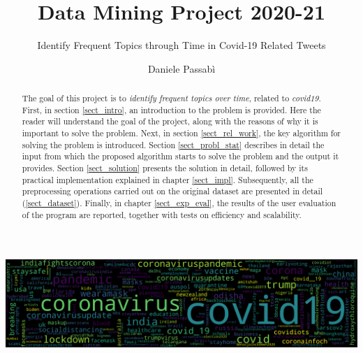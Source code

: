 \documentclass[sigconf,edbt]{acmart-edbt2021}
\begin{document}
\title{Data Mining Project 2020-21}
\subtitle{Identify Frequent Topics through Time in Covid-19 Related Tweets}


\author{Daniele Passabì}


\begin{abstract}
  The goal of this project is to \textit{identify frequent topics over time}, related to \textit{covid19}. First, in section \ref{sect_intro}, an introduction to the problem is provided. Here the reader will understand the goal of the project, along with the reasons of why it is important to solve the problem. Next, in section \ref{sect_rel_work}, the key algorithm for solving the problem is introduced. Section \ref{sect_probl_stat} describes in detail the input from which the proposed algorithm starts to solve the problem and the output it provides. Section \ref{sect_solution} presents the solution in detail, followed by its practical implementation explained in chapter \ref{sect_impl}. Subsequently, all the preprocessing operations carried out on the original dataset are presented in detail (\ref{sect_dataset}). Finally, in chapter \ref{sect_exp_eval}, the results of the user evaluation of the program are reported, together with tests on efficiency and scalability.
\end{abstract}


\begin{teaserfigure}
  \includegraphics[width=\textwidth]{banner.png}
  \label{fig:teaser}
\end{teaserfigure}

\maketitle





\end{document}
